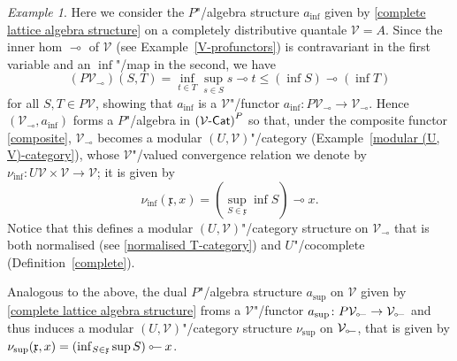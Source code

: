 \documentclass[preprint, a4paper]{elsarticle}
\newcommand{\dashcirc}{\multimap}
\newcommand{\circdash}{\mathbin{\text{\reflectbox{$\multimap$}}}}
\theoremstyle{definition}
\theoremstyle{remark}
\newtheorem{example}[theorem]{Example}
\providecommand{\defref}[1]{Definition~\ref{#1}}
\providecommand{\exref}[1]{Example~\ref{#1}}
\providecommand{\mf}[1]{\mathfrak{#1}}
\providecommand{\pars}[1]{\left(#1\right)}
\providecommand{\map}[3]{#1\colon#2\to#3}
\providecommand{\catvar}[1]{\mathcal{#1}}
\providecommand{\2}{\mathsf 2}
\providecommand{\V}{\catvar V}
\providecommand{\Cat}{\mathsf{Cat}}
\providecommand{\enCat}[1]{#1\text-\Cat}
\begin{document}
	\begin{example} \label{V as a modular approach space}
		Here we consider the $P$"/algebra structure $a_{\inf}$ given by \eqref{complete lattice algebra structure} on a completely distributive quantale $\V = A$. Since the inner hom $\dashcirc$ of $\V$ (see \exref{V-profunctors}) is contravariant in the first variable and an $\inf$"/map in the second, we have
		\begin{displaymath}
			(P\V_{\dashcirc})(S, T) = \inf_{t \in T} \sup_{s \in S} s \dashcirc t \leq (\inf S) \dashcirc (\inf T)
		\end{displaymath}
		for all $S, T \in P\V$, showing that $a_{\inf}$ is a $\V$"/functor $\map{a_{\inf}}{P\V_{\dashcirc}}{\V_{\dashcirc}}$. Hence $(\V_{\dashcirc}, a_{\inf})$ forms a $P$"/algebra in $\pars{\enCat\V}^P$ so that, under the composite functor \eqref{composite}, $\V_{\dashcirc}$ becomes a modular $(U, \V)$"/category (\exref{modular (U, V)-category}), whose $\V$"/valued convergence relation we denote by $\map{\nu_{\inf}}{U\V \times \V}\V$; it is given by
		\begin{displaymath}
			\nu_{\inf}(\mf x, x) = (\sup_{S \in \mf x} \inf S) \dashcirc x.
		\end{displaymath}
		Notice that this defines a modular $(U, \V)$"/category structure on $\V_{\dashcirc}$ that is both normalised (see \eqref{normalised T-category}) and $U$"/cocomplete (\defref{complete}).

		Analogous to the above, the dual $P$"/algebra structure $a_{\sup}$ on $\V$ given by \eqref{complete lattice algebra structure} froms a $\V$"/functor $\map{a_{\sup}}{P\V_{\circdash}}{\V_{\circdash}}$ and thus induces a modular $(U, \V)$"/category structure $\nu_{\sup}$ on $\V_{\circdash}$, that is given by $\nu_{\sup}(\mf x, x) = (\inf_{S \in \mf x} \sup S) \circdash x$.
	\end{example}
\end{document}

